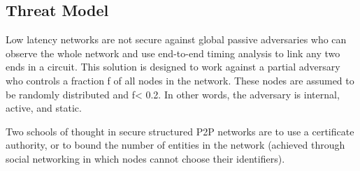 \documentclass{article}
\begin{document}
\subsection{Threat Model}

Low latency networks are not secure against global passive adversaries who can observe the whole network and use end-to-end timing analysis to link any two ends in a circuit.  This solution is designed to work against a partial adversary who controls a fraction f of all nodes in the network. These nodes are assumed to be randomly distributed and f< 0.2. In other words, the adversary is internal, active, and static.

Two schools of thought in secure structured P2P networks are to use a certificate authority, or to bound the number of entities in the network (achieved through social networking in which nodes cannot choose their identifiers).
\end{document}
